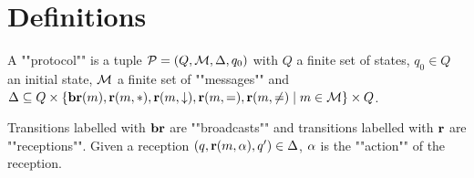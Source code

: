 \section{Definitions}

\begin{definition}
	A ""protocol"" is a tuple $\mathcal{P} = (Q, \mathcal{M}, \Delta, q_0)$  with $Q$ a finite set of states, $q_0 \in Q$ an initial state, $\mathcal{M}$ a finite set of ""messages""  and $\Delta \subseteq Q \times \{\textbf{br}(m), \textbf{r}(m, {*}), \textbf{r}(m, \downarrow), \textbf{r}(m, {=}), \textbf{r}(m, {\ne}) \mid m \in \mathcal{M}\} \times Q$.
	
	Transitions labelled with $\textbf{br}$ are ""broadcasts"" and transitions labelled with $\textbf{r}$ are ""receptions"".
Given a reception $(q,\textbf{r}(m, \alpha), q') \in \Delta$, $\alpha$ is the ""action"" of the reception.
\end{definition}

